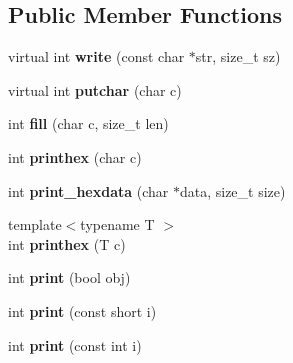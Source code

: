 \subsection*{Public Member Functions}
\begin{DoxyCompactItemize}
\item 
virtual int {\bfseries write} (const char $\ast$str, size\+\_\+t sz)\hypertarget{classgxx_1_1io_1_1ostream_a080bd8ef24cee5888f369f44b522fc2b}{}\label{classgxx_1_1io_1_1ostream_a080bd8ef24cee5888f369f44b522fc2b}

\item 
virtual int {\bfseries putchar} (char c)\hypertarget{classgxx_1_1io_1_1ostream_a0a598ff7dcd1adfa3efd219db280a265}{}\label{classgxx_1_1io_1_1ostream_a0a598ff7dcd1adfa3efd219db280a265}

\item 
int {\bfseries fill} (char c, size\+\_\+t len)\hypertarget{classgxx_1_1io_1_1ostream_a4f6d6026d9a95c4b05e29b130bc9bf51}{}\label{classgxx_1_1io_1_1ostream_a4f6d6026d9a95c4b05e29b130bc9bf51}

\item 
int {\bfseries printhex} (char c)\hypertarget{classgxx_1_1io_1_1ostream_a784fe5bed234ef371170cdf9e3094a1f}{}\label{classgxx_1_1io_1_1ostream_a784fe5bed234ef371170cdf9e3094a1f}

\item 
int {\bfseries print\+\_\+hexdata} (char $\ast$data, size\+\_\+t size)\hypertarget{classgxx_1_1io_1_1ostream_a943c6de1d28bd81236f61eaf2f002712}{}\label{classgxx_1_1io_1_1ostream_a943c6de1d28bd81236f61eaf2f002712}

\item 
{\footnotesize template$<$typename T $>$ }\\int {\bfseries printhex} (T c)\hypertarget{classgxx_1_1io_1_1ostream_a823da81125ba83ea267132db0791e49a}{}\label{classgxx_1_1io_1_1ostream_a823da81125ba83ea267132db0791e49a}

\item 
int {\bfseries print} (bool obj)\hypertarget{classgxx_1_1io_1_1ostream_a2338c8cca2d465249875b81475a7cb6d}{}\label{classgxx_1_1io_1_1ostream_a2338c8cca2d465249875b81475a7cb6d}

\item 
int {\bfseries print} (const short i)\hypertarget{classgxx_1_1io_1_1ostream_a3ee1fd21674985e35906b14657b0d3a8}{}\label{classgxx_1_1io_1_1ostream_a3ee1fd21674985e35906b14657b0d3a8}

\item 
int {\bfseries print} (const int i)\hypertarget{classgxx_1_1io_1_1ostream_ad3671923ccef538decb0e1f29cd6c7ba}{}\label{classgxx_1_1io_1_1ostream_ad3671923ccef538decb0e1f29cd6c7ba}


\end{DoxyCompactItemize}
